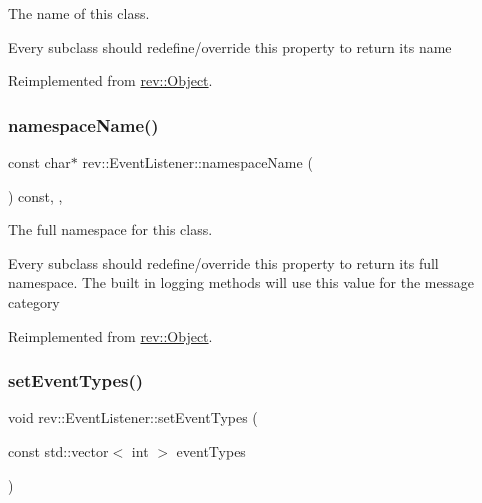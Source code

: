 The name of this class. 

Every subclass should redefine/override this property to return its name 

Reimplemented from \mbox{\hyperlink{classrev_1_1_object_a7a2013f91169479b65cf93afdc5d9a68}{rev\+::\+Object}}.

\mbox{\label{classrev_1_1_event_listener_ada92683ca9340c93b2e6d84e9716fdcc}} 
\subsubsection{\texorpdfstring{namespaceName()}{namespaceName()}}
{\footnotesize\ttfamily const char$\ast$ rev\+::\+Event\+Listener\+::namespace\+Name (\begin{DoxyParamCaption}{ }\end{DoxyParamCaption}) const\hspace{0.3cm}{\ttfamily [inline]}, {\ttfamily [override]}, {\ttfamily [virtual]}}



The full namespace for this class. 

Every subclass should redefine/override this property to return its full namespace. The built in logging methods will use this value for the message category 

Reimplemented from \mbox{\hyperlink{classrev_1_1_object_aaeb638d3e10f361c56c211a318a27f3d}{rev\+::\+Object}}.

\mbox{\label{classrev_1_1_event_listener_a0f3261f5c3856571f3fc16ebee61b725}} 
\subsubsection{\texorpdfstring{setEventTypes()}{setEventTypes()}}
{\footnotesize\ttfamily void rev\+::\+Event\+Listener\+::set\+Event\+Types (\begin{DoxyParamCaption}\item[{const std\+::vector$<$ int $>$}]{event\+Types }\end{DoxyParamCaption})}



